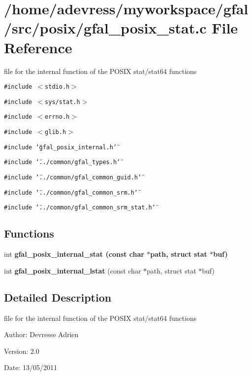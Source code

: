 \section{/home/adevress/myworkspace/gfal/src/posix/gfal\_\-posix\_\-stat.c File Reference}
\label{gfal__posix__stat_8c}
file for the internal function of the POSIX stat/stat64 functions 

{\tt \#include $<$stdio.h$>$}\par
{\tt \#include $<$sys/stat.h$>$}\par
{\tt \#include $<$errno.h$>$}\par
{\tt \#include $<$glib.h$>$}\par
{\tt \#include \char`\"{}gfal\_\-posix\_\-internal.h\char`\"{}}\par
{\tt \#include \char`\"{}../common/gfal\_\-types.h\char`\"{}}\par
{\tt \#include \char`\"{}../common/gfal\_\-common\_\-guid.h\char`\"{}}\par
{\tt \#include \char`\"{}../common/gfal\_\-common\_\-srm.h\char`\"{}}\par
{\tt \#include \char`\"{}../common/gfal\_\-common\_\-srm\_\-stat.h\char`\"{}}\par
\subsection*{Functions}
\begin{CompactItemize}
\item 
int \bf{gfal\_\-posix\_\-internal\_\-stat} (const char $\ast$path, struct stat $\ast$buf)
\item 
int \textbf{gfal\_\-posix\_\-internal\_\-lstat} (const char $\ast$path, struct stat $\ast$buf)\label{gfal__posix__stat_8c_ec4c6fc5e973e8fdb29bbff0a0fb096d}

\end{CompactItemize}


\subsection{Detailed Description}
file for the internal function of the POSIX stat/stat64 functions 

\begin{Desc}
\item[Author:]Devresse Adrien \end{Desc}
\begin{Desc}
\item[Version:]2.0 \end{Desc}
\begin{Desc}
\item[Date:]13/05/2011 \end{Desc}


